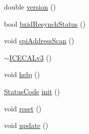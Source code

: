 \begin{DoxyCompactItemize}
\item 
double \hyperlink{classICECALv3_a7f3f8012d2e5c45f8e43819befa3f915}{version} ()
\item 
bool \hyperlink{classICECALv3_a545f51b915a6de5c5f450622d0651a85}{bxid\+Resynch\+Status} ()
\item 
void \hyperlink{classICECALv3_acbf1a7a8510d7e02280bacc58badf4f4}{spi\+Address\+Scan} ()
\item 
\hyperlink{classICECALv3_acdadf9483fc38a615192de41548024a1}{$\sim$\+I\+C\+E\+C\+A\+Lv3} ()
\item 
void \hyperlink{classICECALv3_a00e572849b4952e7cf04a39f992df037}{help} ()
\item 
\hyperlink{classStatusCode}{Status\+Code} \hyperlink{classICECALv3_abf7281fad80b80b70c5b13ce66ba3451}{init} ()
\item 
void \hyperlink{classICECALv3_a33afc7c8e0f399336152abd03cbe8d1b}{reset} ()
\item 
void \hyperlink{classICECALv3_ab2a00809e9a4f2ab83ef041a886ca637}{update} ()
\end{DoxyCompactItemize}
